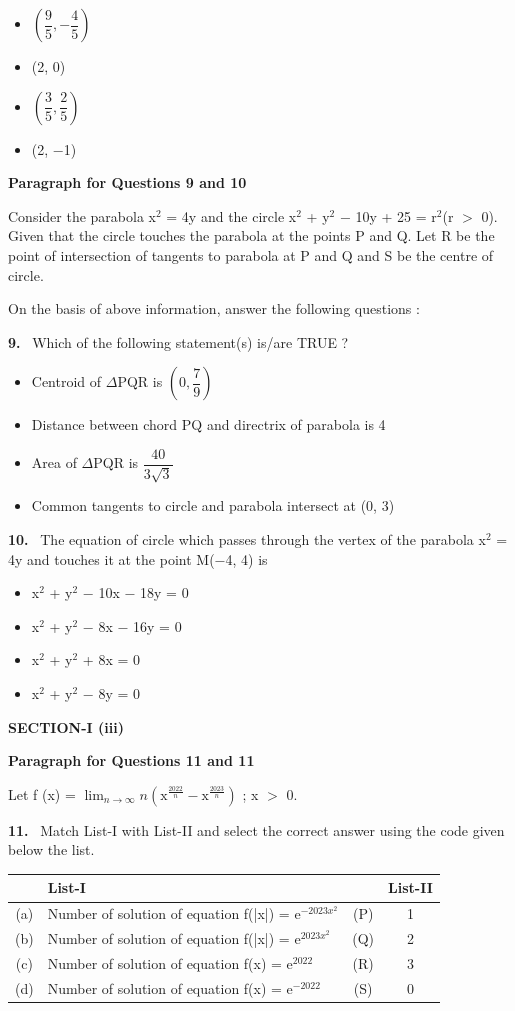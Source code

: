 \documentclass[10pt]{extarticle}
\newcommand{\sect}[1]{\par\smallskip\noindent\textbf{#1}\par}
\newcommand{\qn}[1]{\par\smallskip\noindent\textbf{#1.}~}
\newcommand{\paraq}[2]{\par\smallskip\noindent\textbf{Paragraph for Questions #1 and #2}\par}
\newenvironment{qoptions}{\begin{itemize}[leftmargin=1.8em,itemsep=1pt,topsep=2pt,label={}]}{\end{itemize}}
\newcommand{\opt}[2]{\item[(#1)] #2}
\begin{document}
\begin{multicols}{2}
\begin{qoptions}
\opt{A}{$\left(\dfrac{9}{5},-\dfrac{4}{5}\right)$}
\opt{B}{(2, 0)}
\opt{C}{$\left(\dfrac{3}{5},\dfrac{2}{5}\right)$}
\opt{D}{(2, $-$1)}
\end{qoptions}
\paraq{9}{10}Consider the parabola x$^2$ = 4y and the circle x$^2$ + y$^2$ $-$ 10y + 25 = r$^2$(r $>$ 0). Given that the circle touches the parabola at the points P and Q. Let R be the point of intersection of tangents to parabola at P and Q and S be the centre of circle.\par
On the basis of above information, answer the following questions :\par
\qn{9} Which of the following statement(s) is/are TRUE ?
\begin{qoptions}
\opt{A}{Centroid of $\Delta$PQR is $\left(0,\dfrac{7}{9}\right)$}
\opt{B}{Distance between chord PQ and directrix of parabola is 4}
\opt{C}{Area of $\Delta$PQR is $\dfrac{40}{3\sqrt{3}}$}
\opt{D}{Common tangents to circle and parabola intersect at (0, 3)}
\end{qoptions}
\qn{10} The equation of circle which passes through the vertex of the parabola x$^2$ = 4y and touches it at the point M($-$4, 4) is
\begin{qoptions}
\opt{A}{x$^2$ + y$^2$ $-$ 10x $-$ 18y = 0}
\opt{B}{x$^2$ + y$^2$ $-$ 8x $-$ 16y = 0}
\opt{C}{x$^2$ + y$^2$ + 8x = 0}
\opt{D}{x$^2$ + y$^2$ $-$ 8y = 0}
\end{qoptions}
\sect{SECTION-I (iii)}
\paraq{11}{11}Let f (x) = $\displaystyle\lim_{n\to\infty}n\left(\text{x}^{\frac{2022}{n}}-\text{x}^{\frac{2023}{n}}\right)$ ; x $>$ 0.\par
\qn{11} Match List-I with List-II and select the correct answer using the code given below the list.\par
{\footnotesize\setlength{\tabcolsep}{1.5pt}\noindent\begin{tabular}{|c|L{3.6cm}|c|c|}
\hline
 & List-I & & List-II \\
\hline
(a) & Number of solution of equation f(|x|) = e$^{-2023x^2}$ & (P) & 1 \\
\hline
(b) & Number of solution of equation f(|x|) = e$^{2023x^2}$ & (Q) & 2 \\
\hline
(c) & Number of solution of equation f(x) = e$^{2022}$ & (R) & 3 \\
\hline
(d) & Number of solution of equation f(x) = e$^{-2022}$ & (S) & 0 \\
\hline
\end{tabular}}\par
\begin{qoptions}

\end{qoptions}
\end{multicols}
\end{document}
